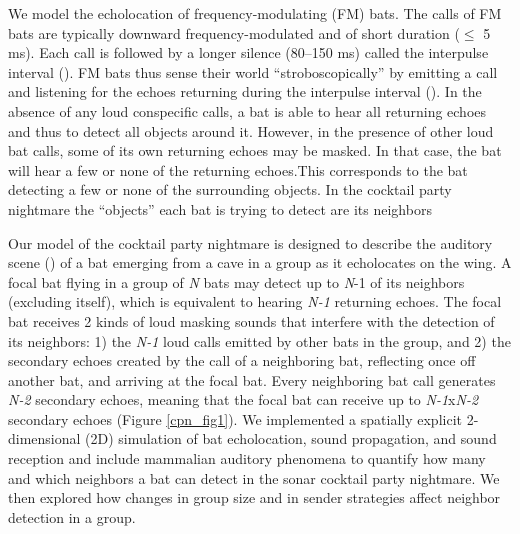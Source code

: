 \documentclass[
]{book}
\begin{document}
We model the echolocation of frequency-modulating (FM) bats. The calls of FM bats are typically downward frequency-modulated and of short duration (\(\leq\) 5 ms). Each call is followed by a longer silence (80--150 ms) called the interpulse interval (\citet{jones1999a}). FM bats thus sense their world ``stroboscopically'' by emitting a call and listening for the echoes returning during the interpulse interval (\citet{griffin1941a}). In the absence of any loud conspecific calls, a bat is able to hear all returning echoes and thus to detect all objects around it. However, in the presence of other loud bat calls, some of its own returning echoes may be masked. In that case, the bat will hear a few or none of the returning echoes.This corresponds to the bat detecting a few or none of the surrounding objects. In the cocktail party nightmare the ``objects'' each bat is trying to detect are its neighbors

Our model of the cocktail party nightmare is designed to describe the auditory scene (\citet{ulanovsky2008a}) of a bat emerging from a cave in a group as it echolocates on the wing. A focal bat flying in a group of \emph{N} bats may detect up to \emph{N}-1 of its neighbors (excluding itself), which is equivalent to hearing \emph{N-1} returning echoes. The focal bat receives 2 kinds of loud masking sounds that interfere with the detection of its neighbors: 1) the \emph{N-1} loud calls emitted by other bats in the group, and 2) the secondary echoes created by the call of a neighboring bat, reflecting once off another bat, and arriving at the focal bat. Every neighboring bat call generates \emph{N-2} secondary echoes, meaning that the focal bat can receive up to \emph{N-1}x\emph{N-2} secondary echoes (Figure \ref{cpn_fig1}). We implemented a spatially explicit 2-dimensional (2D) simulation of bat echolocation, sound propagation, and sound reception and include mammalian auditory phenomena to quantify how many and which neighbors a bat can detect in the sonar cocktail party nightmare. We then explored how changes in group size and in sender strategies affect neighbor detection in a group.
\end{document}
